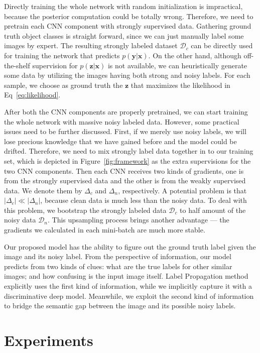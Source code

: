 \documentclass[10pt,twocolumn,letterpaper]{article}
\def\vec{\mathbf}
\begin{document}
Directly training the whole network with random initialization is impractical, because the posterior computation could be totally wrong. Therefore, we need to pretrain each CNN component with strongly supervised data. Gathering ground truth object classes is straight forward, since we can just manually label some images by expert. The resulting strongly labeled dataset $\mathcal{D}_c$ can be directly used for training the network that predicts $p(\vec{y}|\vec{x})$. On the other hand, although off-the-shelf supervision for $p(\vec{z}|\vec{x})$ is not available, we can heuristically generate some data by utilizing the images having both strong and noisy labels. For each sample, we choose as ground truth the $\vec{z}$ that maximizes the likelihood in Eq~\eqref{eq:likelihood}.

After both the CNN components are properly pretrained, we can start training the whole network with massive noisy labeled data. However, some practical issues need to be further discussed. First, if we merely use noisy labels, we will lose precious knowledge that we have gained before and the model could be drifted. Therefore, we need to mix strongly label data together in to our training set, which is depicted in Figure~\ref{fig:framework} as the extra supervisions for the two CNN components. Then each CNN receives two kinds of gradients, one is from the strongly supervised data and the other is from the weakly supervised data. We denote them by $\Delta_c$ and $\Delta_n$, respectively. A potential problem is that $|\Delta_c| \ll |\Delta_n|$, because clean data is much less than the noisy data. To deal with this problem, we bootstrap the strongly labeled data $\mathcal{D}_c$ to half amount of the noisy data $\mathcal{D}_n$. This upsampling process brings another advantage --- the gradients we calculated in each mini-batch are much more stable.

Our proposed model has the ability to figure out the ground truth label given the image and its noisy label. From the perspective of information, our model predicts from two kinds of clues: what are the true labels for other similar images; and how confusing is the input image itself. Label Propagation method~\cite{zhu2002learning} explicitly uses the first kind of information, while we implicitly capture it with a discriminative deep model. Meanwhile, we exploit the second kind of information to bridge the semantic gap between the image and its possible noisy labels.

\section{Experiments} %
\label{sec:experiments}
\end{document}
